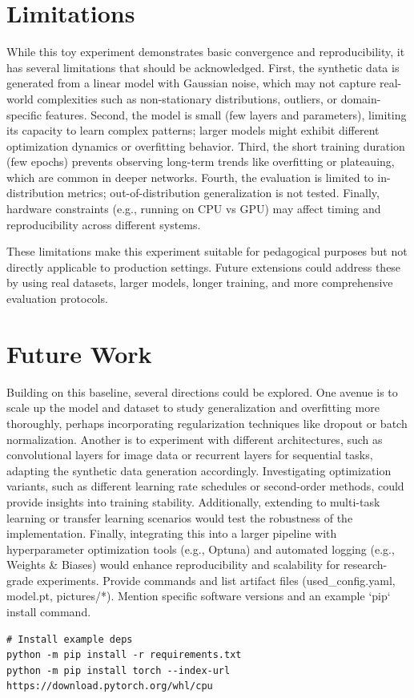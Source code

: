 \documentclass[11pt]{article}
\begin{document}
\section{Limitations}
While this toy experiment demonstrates basic convergence and reproducibility, it has several limitations that should be acknowledged. First, the synthetic data is generated from a linear model with Gaussian noise, which may not capture real-world complexities such as non-stationary distributions, outliers, or domain-specific features. Second, the model is small (few layers and parameters), limiting its capacity to learn complex patterns; larger models might exhibit different optimization dynamics or overfitting behavior. Third, the short training duration (few epochs) prevents observing long-term trends like overfitting or plateauing, which are common in deeper networks. Fourth, the evaluation is limited to in-distribution metrics; out-of-distribution generalization is not tested. Finally, hardware constraints (e.g., running on CPU vs GPU) may affect timing and reproducibility across different systems.

These limitations make this experiment suitable for pedagogical purposes but not directly applicable to production settings. Future extensions could address these by using real datasets, larger models, longer training, and more comprehensive evaluation protocols.

\section{Future Work}
Building on this baseline, several directions could be explored. One avenue is to scale up the model and dataset to study generalization and overfitting more thoroughly, perhaps incorporating regularization techniques like dropout or batch normalization. Another is to experiment with different architectures, such as convolutional layers for image data or recurrent layers for sequential tasks, adapting the synthetic data generation accordingly. Investigating optimization variants, such as different learning rate schedules or second-order methods, could provide insights into training stability. Additionally, extending to multi-task learning or transfer learning scenarios would test the robustness of the implementation. Finally, integrating this into a larger pipeline with hyperparameter optimization tools (e.g., Optuna) and automated logging (e.g., Weights \& Biases) would enhance reproducibility and scalability for research-grade experiments.
Provide commands and list artifact files (used_config.yaml, model.pt, pictures/*). Mention specific software versions and an example `pip` install command.
\begin{verbatim}
# Install example deps
python -m pip install -r requirements.txt
python -m pip install torch --index-url https://download.pytorch.org/whl/cpu
\end{verbatim}
\end{document}
